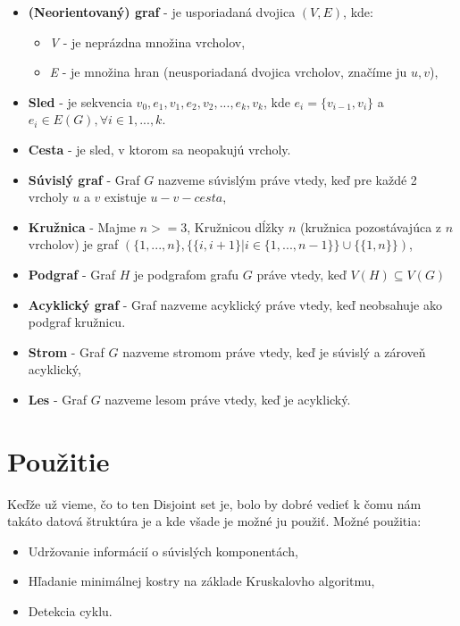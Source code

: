 \documentclass{book}
\begin{document}
\begin{itemize}
	\item \textbf{(Neorientovaný) graf} - je usporiadaná dvojica $(V, E)$,
	kde:
		\begin{itemize}
			\item \textit{V} - je neprázdna množina vrcholov,
			\item \textit{E} - je množina hran (neusporiadaná
				dvojica vrcholov, značíme ju ${u, v}$),
		\end{itemize}
	\item \textbf{Sled} - je sekvencia $v_{0}, e_{1}, v_{1}, e_{2}, v_{2},
		..., e_{k}, v_{k}$, kde $e_{i} =\{v_{i-1}, v_{i}\}$ a $e_{i}
		\in E(G), \forall i \in {1, ..., k}$.  
	\item \textbf{Cesta} - je sled, v ktorom sa neopakujú vrcholy.
	\item \textbf{Súvislý graf} - Graf $G$ nazveme súvislým práve vtedy,
		keď pre každé 2 vrcholy $u$ a $v$ existuje $u-v-cesta$, 
	\item \textbf{Kružnica} - Majme $n>=3$, Kružnicou dĺžky $n$ (kružnica
		pozostávajúca z $n$ vrcholov) je graf $(\{1,...,n\}, \{\{i, i +
		1\} | i \in \{1, ..., n - 1\}\} \cup \{\{1, n\}\})$,
	\item \textbf{Podgraf} - Graf $H$ je podgrafom grafu $G$ práve vtedy,
		keď $V(H) \subseteq V(G)$ 
	\item \textbf{Acyklický graf} - Graf nazveme acyklický práve vtedy, keď
		neobsahuje ako podgraf kružnicu.
	\item \textbf{Strom} - Graf $G$ nazveme stromom práve vtedy, keď je
		súvislý a zároveň acyklický,
	\item \textbf{Les} - Graf $G$ nazveme lesom práve vtedy, keď je
		acyklický.
\end{itemize}

\section{Použitie}

Keďže už vieme, čo to ten Disjoint set je, bolo by dobré vedieť k čomu nám
takáto datová štruktúra je a kde všade je možné ju použiť. Možné použitia:
\begin{itemize}
	\item Udržovanie informácií o súvislých komponentách,
	\item Hľadanie minimálnej kostry na základe Kruskalovho algoritmu, 
	\item Detekcia cyklu.
\end{itemize}
\end{document}
